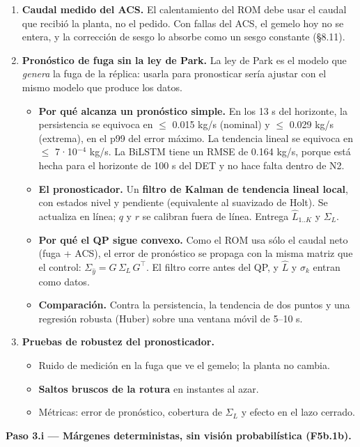 \documentclass[11pt,a4paper]{article}
\begin{document}
\begin{enumerate}
\item \textbf{Caudal medido del ACS.} El calentamiento del ROM debe usar el caudal que recibió la planta, no el pedido. Con fallas del ACS, el gemelo hoy no se entera, y la corrección de sesgo lo absorbe como un sesgo constante (\S{}8.11).
\item \textbf{Pronóstico de fuga sin la ley de Park.} La ley de Park es el modelo que \emph{genera} la fuga de la réplica: usarla para pronosticar sería ajustar con el mismo modelo que produce los datos.
\begin{itemize}
\item \textbf{Por qué alcanza un pronóstico simple.} En los 13 s del horizonte, la persistencia se equivoca en $\le$ 0.015 kg/s (nominal) y $\le$ 0.029 kg/s (extrema), en el p99 del error máximo. La tendencia lineal se equivoca en $\le$ 7·10$^{-4}$ kg/s. La BiLSTM tiene un RMSE de 0.164 kg/s, porque está hecha para el horizonte de 100 s del DET y no hace falta dentro de N2.
\item \textbf{El pronosticador.} Un \textbf{filtro de Kalman de tendencia lineal local}, con estados nivel y pendiente (equivalente al suavizado de Holt). Se actualiza en línea; $q$ y $r$ se calibran fuera de línea. Entrega $\hat L_{1..K}$ y $\Sigma_L$.
\item \textbf{Por qué el QP sigue convexo.} Como el ROM usa sólo el caudal neto (fuga + ACS), el error de pronóstico se propaga con la misma matriz que el control: $\Sigma_{\hat y}=G\,\Sigma_L\,G^\top$. El filtro corre antes del QP, y $\hat L$ y $\sigma_k$ entran como datos.
\item \textbf{Comparación.} Contra la persistencia, la tendencia de dos puntos y una regresión robusta (Huber) sobre una ventana móvil de 5–10 s.
\end{itemize}
\item \textbf{Pruebas de robustez del pronosticador.}
\begin{itemize}
\item Ruido de medición en la fuga que ve el gemelo; la planta no cambia.
\item \textbf{Saltos bruscos de la rotura} en instantes al azar.
\item Métricas: error de pronóstico, cobertura de $\Sigma_L$ y efecto en el lazo cerrado.
\end{itemize}
\end{enumerate}

\textbf{Paso 3.i — Márgenes deterministas, sin visión probabilística (F5b.1b).}
\end{document}
